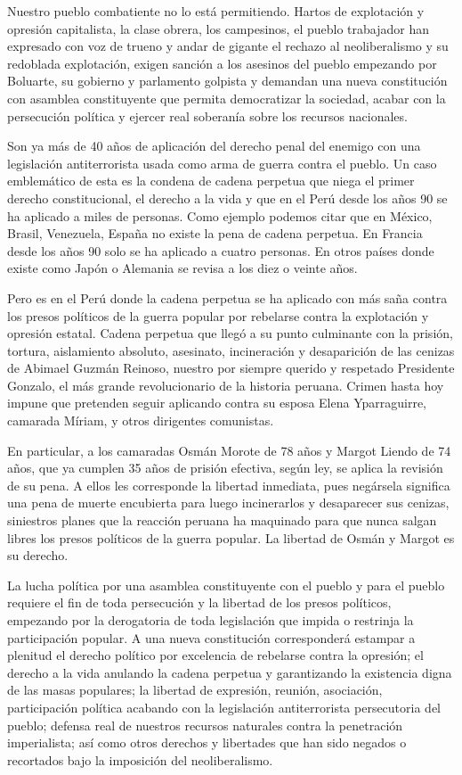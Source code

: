 \documentclass[
  a4paper,
]{article}
\begin{document}
Nuestro pueblo combatiente no lo está permitiendo. Hartos de explotación
y opresión capitalista, la clase obrera, los campesinos, el pueblo
trabajador han expresado con voz de trueno y andar de gigante el rechazo
al neoliberalismo y su redoblada explotación, exigen sanción a los
asesinos del pueblo empezando por Boluarte, su gobierno y parlamento
golpista y demandan una nueva constitución con asamblea constituyente
que permita democratizar la sociedad, acabar con la persecución política
y ejercer real soberanía sobre los recursos nacionales.

Son ya más de 40 años de aplicación del derecho penal del enemigo con
una legislación antiterrorista usada como arma de guerra contra el
pueblo. Un caso emblemático de esta es la condena de cadena perpetua que
niega el primer derecho constitucional, el derecho a la vida y que en el
Perú desde los años 90 se ha aplicado a miles de personas. Como ejemplo
podemos citar que en México, Brasil, Venezuela, España no existe la pena
de cadena perpetua. En Francia desde los años 90 solo se ha aplicado a
cuatro personas. En otros países donde existe como Japón o Alemania se
revisa a los diez o veinte años.

Pero es en el Perú donde la cadena perpetua se ha aplicado con más saña
contra los presos políticos de la guerra popular por rebelarse contra la
explotación y opresión estatal. Cadena perpetua que llegó a su punto
culminante con la prisión, tortura, aislamiento absoluto, asesinato,
incineración y desaparición de las cenizas de Abimael Guzmán Reinoso,
nuestro por siempre querido y respetado Presidente Gonzalo, el más
grande revolucionario de la historia peruana. Crimen hasta hoy impune
que pretenden seguir aplicando contra su esposa Elena Yparraguirre,
camarada Míriam, y otros dirigentes comunistas.

En particular, a los camaradas Osmán Morote de 78 años y Margot Liendo
de 74 años, que ya cumplen 35 años de prisión efectiva, según ley, se
aplica la revisión de su pena. A ellos les corresponde la libertad
inmediata, pues negársela significa una pena de muerte encubierta para
luego incinerarlos y desaparecer sus cenizas, siniestros planes que la
reacción peruana ha maquinado para que nunca salgan libres los presos
políticos de la guerra popular. La libertad de Osmán y Margot es su
derecho.

La lucha política por una asamblea constituyente con el pueblo y para el
pueblo requiere el fin de toda persecución y la libertad de los presos
políticos, empezando por la derogatoria de toda legislación que impida o
restrinja la participación popular. A una nueva constitución
corresponderá estampar a plenitud el derecho político por excelencia de
rebelarse contra la opresión; el derecho a la vida anulando la cadena
perpetua y garantizando la existencia digna de las masas populares; la
libertad de expresión, reunión, asociación, participación política
acabando con la legislación antiterrorista persecutoria del pueblo;
defensa real de nuestros recursos naturales contra la penetración
imperialista; así como otros derechos y libertades que han sido negados
o recortados bajo la imposición del neoliberalismo.
\end{document}
